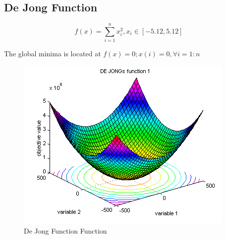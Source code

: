 \documentclass{article}
\begin{document}
\subsection{De Jong Function\cite{dejong}}

$$
f(x) = \sum^n_{i=1}{x_i^2},
x_i \in \left[ -5.12 , 5.12 \right]
$$

The global minima is located at $f(x)=0; x(i)=0,  \forall i=1:n $

\begin{figure}[!h]
  \includegraphics[width=\textwidth,height=\textheight,keepaspectratio]{dejong.png}
  \caption{De Jong Function Function\cite{dejong_img}}
\end{figure}
\end{document}
